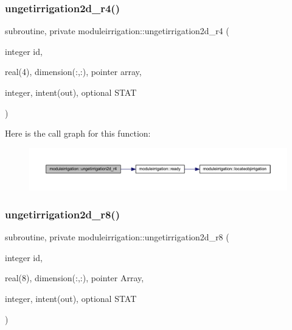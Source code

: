\subsubsection{\texorpdfstring{ungetirrigation2d\+\_\+r4()}{ungetirrigation2d\_r4()}}
{\footnotesize\ttfamily subroutine, private moduleirrigation\+::ungetirrigation2d\+\_\+r4 (\begin{DoxyParamCaption}\item[{integer}]{id,  }\item[{real(4), dimension(\+:,\+:), pointer}]{array,  }\item[{integer, intent(out), optional}]{S\+T\+AT }\end{DoxyParamCaption})\hspace{0.3cm}{\ttfamily [private]}}

Here is the call graph for this function\+:\nopagebreak
\begin{figure}[H]
\begin{center}
\leavevmode
\includegraphics[width=350pt]{namespacemoduleirrigation_a6f3edc54a431fcfb5b0676e0e83f9113_cgraph}
\end{center}
\end{figure}
\mbox{\label{namespacemoduleirrigation_a05ab21ff0a3d20f186805f3b6d100c9a}} 
\subsubsection{\texorpdfstring{ungetirrigation2d\+\_\+r8()}{ungetirrigation2d\_r8()}}
{\footnotesize\ttfamily subroutine, private moduleirrigation\+::ungetirrigation2d\+\_\+r8 (\begin{DoxyParamCaption}\item[{integer}]{id,  }\item[{real(8), dimension(\+:,\+:), pointer}]{Array,  }\item[{integer, intent(out), optional}]{S\+T\+AT }\end{DoxyParamCaption})\hspace{0.3cm}{\ttfamily [private]}}

